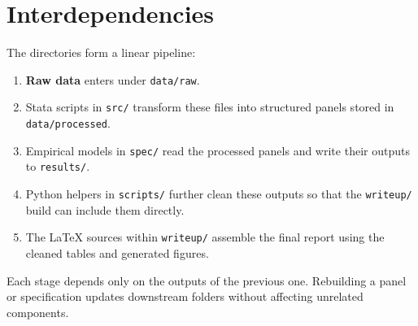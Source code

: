 \documentclass[11pt]{article}
\newcommand{\code}[1]{\texttt{#1}}
\begin{document}
\section{Interdependencies}

The directories form a linear pipeline:

\begin{enumerate}[label=\arabic*)]
  \item \textbf{Raw data} enters under \code{data/raw}.
  \item Stata scripts in \code{src/} transform these files into structured
        panels stored in \code{data/processed}.
  \item Empirical models in \code{spec/} read the processed panels and
        write their outputs to \code{results/}.
  \item Python helpers in \code{scripts/} further clean these outputs so that
        the \code{writeup/} build can include them directly.
  \item The \LaTeX{} sources within \code{writeup/} assemble the final
        report using the cleaned tables and generated figures.
\end{enumerate}

Each stage depends only on the outputs of the previous one. Rebuilding a
panel or specification updates downstream folders without affecting
unrelated components.
\end{document}
